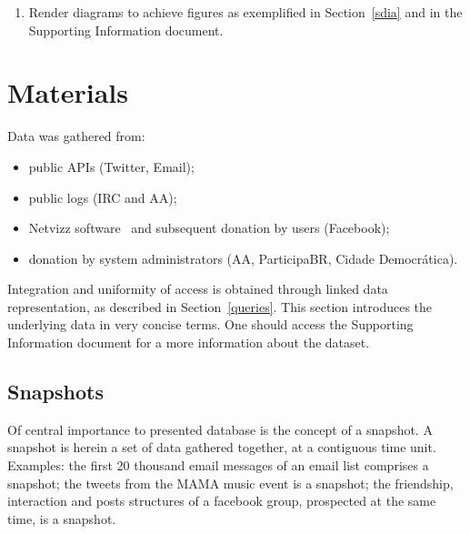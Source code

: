 \documentclass[review]{elsarticle}
\newcommand{\textttt}[1] {\texttt{\footnotesize#1}}
\begin{document}
\begin{enumerate}[leftmargin=0cm]
      \item Render diagrams to achieve figures as exemplified in Section~\ref{sdia} and in the Supporting Information document.
\end{enumerate}


\section{Materials}\label{materials}
Data was gathered from:
\begin{itemize}
    \item public APIs (Twitter, Email);
    \item public logs (IRC and AA);
    \item Netvizz software~\cite{netvizz} and subsequent donation by users (Facebook);
    \item donation by system administrators (AA, ParticipaBR, Cidade Democr\'atica).
\end{itemize}

Integration and uniformity of access is obtained through linked data
representation, as described in Section~\ref{queries}.
This section introduces the underlying data in very concise terms.
One should access the Supporting Information document for
a more information about the dataset.

\subsection{Snapshots}
Of central importance to presented database is the concept of a snapshot.
A snapshot is herein a set of data gathered together, at a contiguous time
unit.
Examples: the first 20 thousand email messages of an email list
comprises a snapshot; the tweets from the MAMA music event is a
snapshot; the friendship, interaction and posts structures of a facebook
group, prospected at the same time, is a snapshot.
\end{document}
